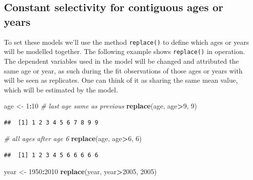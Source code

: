 \documentclass[
]{book}
\newenvironment{Shaded}{\begin{snugshade}}{\end{snugshade}}
\newcommand{\CommentTok}[1]{\textcolor[rgb]{0.56,0.35,0.01}{\textit{#1}}}
\newcommand{\DecValTok}[1]{\textcolor[rgb]{0.00,0.00,0.81}{#1}}
\newcommand{\FunctionTok}[1]{\textcolor[rgb]{0.13,0.29,0.53}{\textbf{#1}}}
\newcommand{\NormalTok}[1]{#1}
\newcommand{\OtherTok}[1]{\textcolor[rgb]{0.56,0.35,0.01}{#1}}
\newcommand{\SpecialCharTok}[1]{\textcolor[rgb]{0.81,0.36,0.00}{\textbf{#1}}}
\begin{document}
\hypertarget{constant-selectivity-for-contiguous-ages-or-years}{%
\subsection{Constant selectivity for contiguous ages or years}\label{constant-selectivity-for-contiguous-ages-or-years}}

To set these models we'll use the method \texttt{replace()} to define which ages or years will be modelled together. The following example shows \texttt{replace()} in operation. The dependent variables used in the model will be changed and attributed the same age or year, as such during the fit observations of those ages or years with will be seen as replicates. One can think of it as sharing the same mean value, which will be estimated by the model.

\begin{Shaded}
\begin{Highlighting}[]
\NormalTok{age }\OtherTok{\textless{}{-}} \DecValTok{1}\SpecialCharTok{:}\DecValTok{10}
\CommentTok{\# last age same as previous}
\FunctionTok{replace}\NormalTok{(age, age}\SpecialCharTok{\textgreater{}}\DecValTok{9}\NormalTok{, }\DecValTok{9}\NormalTok{)}
\end{Highlighting}
\end{Shaded}

\begin{verbatim}
##  [1] 1 2 3 4 5 6 7 8 9 9
\end{verbatim}

\begin{Shaded}
\begin{Highlighting}[]
\CommentTok{\# all ages after age 6}
\FunctionTok{replace}\NormalTok{(age, age}\SpecialCharTok{\textgreater{}}\DecValTok{6}\NormalTok{, }\DecValTok{6}\NormalTok{)}
\end{Highlighting}
\end{Shaded}

\begin{verbatim}
##  [1] 1 2 3 4 5 6 6 6 6 6
\end{verbatim}

\begin{Shaded}
\begin{Highlighting}[]
\NormalTok{year }\OtherTok{\textless{}{-}} \DecValTok{1950}\SpecialCharTok{:}\DecValTok{2010}
\FunctionTok{replace}\NormalTok{(year, year}\SpecialCharTok{\textgreater{}}\DecValTok{2005}\NormalTok{, }\DecValTok{2005}\NormalTok{)}
\end{Highlighting}
\end{Shaded}
\end{document}
